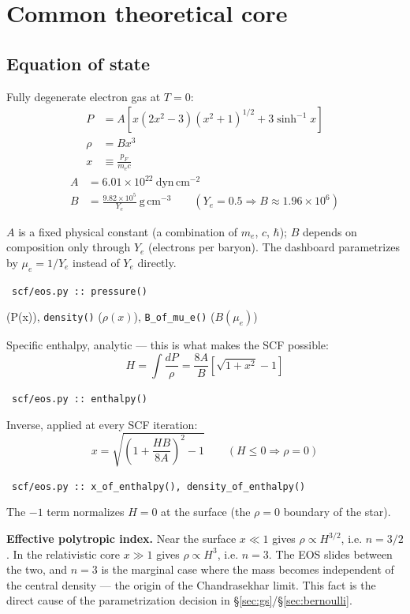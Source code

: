 \documentclass[11pt,a4paper]{scrartcl}
\newcommand{\arrowto}[1]{%
  \par\vspace{2pt}\noindent{\color{linkblue}$\rightarrow$}~\texttt{\small #1}\par\vspace{2pt}}
\newcommand{\code}[1]{\texttt{\small #1}}
\begin{document}
\section{Common theoretical core}
\label{sec:nucleo}

\subsection{Equation of state}
\label{sec:eos}

Fully degenerate electron gas at $T=0$:
\begin{align}
P &= A\left[x(2x^2-3)(x^2+1)^{1/2} + 3\sinh^{-1}x\right]\\
\rho &= Bx^3\\
x &\equiv \frac{p_F}{m_ec}
\end{align}
\begin{align}
A &= 6.01\times10^{22}\ \mathrm{dyn\,cm^{-2}}\\
B &= \frac{9.82\times10^{5}}{Y_e}\ \mathrm{g\,cm^{-3}} \qquad (Y_e=0.5 \Rightarrow B\approx1.96\times10^6)
\end{align}

$A$ is a fixed physical constant (a combination of $m_e$, $c$, $\hbar$);
$B$ depends on composition only through $Y_e$ (electrons per baryon). The
dashboard parametrizes by $\mu_e=1/Y_e$ instead of $Y_e$ directly.

\arrowto{scf/eos.py :: pressure()} (P(x)), \code{density()} ($\rho(x)$), \code{B\_of\_mu\_e()} ($B(\mu_e)$)

Specific enthalpy, analytic --- this is what makes the SCF possible:
\begin{equation}
H = \int \frac{dP}{\rho} = \frac{8A}{B}\left[\sqrt{1+x^2}-1\right]
\end{equation}

\arrowto{scf/eos.py :: enthalpy()}

Inverse, applied at every SCF iteration:
\begin{equation}
x = \sqrt{\left(1+\frac{HB}{8A}\right)^2 - 1} \qquad (H\le0 \Rightarrow \rho=0)
\end{equation}

\arrowto{scf/eos.py :: x\_of\_enthalpy(), density\_of\_enthalpy()}

The $-1$ term normalizes $H=0$ at the surface (the $\rho=0$ boundary of the star).

\textbf{Effective polytropic index.} Near the surface $x\ll1$ gives
$\rho\propto H^{3/2}$, i.e. $n=3/2$. In the relativistic core $x\gg1$
gives $\rho\propto H^3$, i.e. $n=3$. The EOS slides between the two, and
$n=3$ is the marginal case where the mass becomes independent of the
central density --- the origin of the Chandrasekhar limit. This fact is
the direct cause of the parametrization decision in
\S\ref{sec:gs}/\S\ref{sec:bernoulli}.
\end{document}
